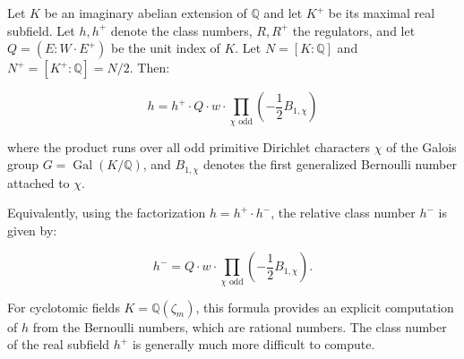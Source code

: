 Let $K$ be an imaginary abelian extension of $\mathbb{Q}$ and let $K^+$ be its maximal real subfield. Let $h, h^+$ denote the class numbers, $R, R^+$ the regulators, and let $Q = (E : W \cdot E^+)$ be the unit index of $K$. Let $N = [K : \mathbb{Q}]$ and $N^+ = [K^+ : \mathbb{Q}] = N/2$. Then:

$$h = h^+ \cdot Q \cdot w \cdot \prod_{\chi \text{ odd}} \left( -\frac{1}{2} B_{1,\chi} \right)$$

where the product runs over all odd primitive Dirichlet characters $\chi$ of the Galois group $G = \operatorname{Gal}(K/\mathbb{Q})$, and $B_{1,\chi}$ denotes the first generalized Bernoulli number attached to $\chi$.

Equivalently, using the factorization $h = h^+ \cdot h^-$, the relative class number $h^-$ is given by:

$$h^- = Q \cdot w \cdot \prod_{\chi \text{ odd}} \left( -\frac{1}{2} B_{1,\chi} \right).$$

For cyclotomic fields $K = \mathbb{Q}(\zeta_m)$, this formula provides an explicit computation of $h$ from the Bernoulli numbers, which are rational numbers. The class number of the real subfield $h^+$ is generally much more difficult to compute.
